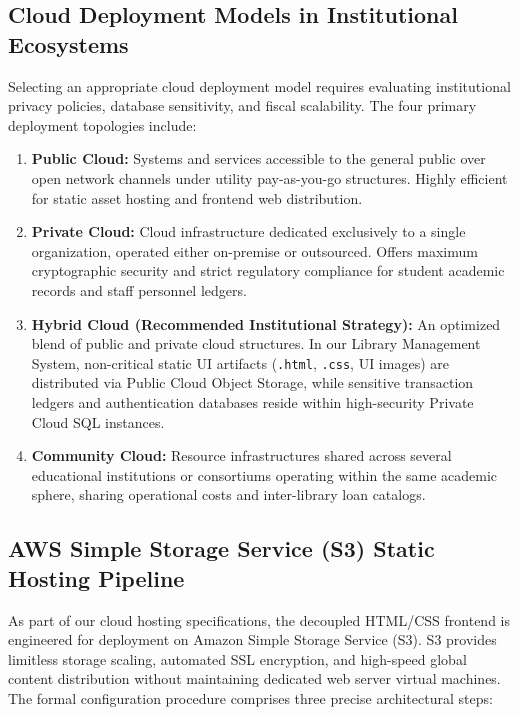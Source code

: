 \documentclass[10pt,journal,compsoc]{IEEEtran}
\begin{document}
\subsection{Cloud Deployment Models in Institutional Ecosystems}
Selecting an appropriate cloud deployment model requires evaluating institutional privacy policies, database sensitivity, and fiscal scalability. The four primary deployment topologies include:
\begin{enumerate}[leftmargin=1.5em]
    \item \textbf{Public Cloud:} Systems and services accessible to the general public over open network channels under utility pay-as-you-go structures. Highly efficient for static asset hosting and frontend web distribution.
    \item \textbf{Private Cloud:} Cloud infrastructure dedicated exclusively to a single organization, operated either on-premise or outsourced. Offers maximum cryptographic security and strict regulatory compliance for student academic records and staff personnel ledgers.
    \item \textbf{Hybrid Cloud (Recommended Institutional Strategy):} An optimized blend of public and private cloud structures. In our Library Management System, non-critical static UI artifacts (\texttt{.html}, \texttt{.css}, UI images) are distributed via Public Cloud Object Storage, while sensitive transaction ledgers and authentication databases reside within high-security Private Cloud SQL instances.
    \item \textbf{Community Cloud:} Resource infrastructures shared across several educational institutions or consortiums operating within the same academic sphere, sharing operational costs and inter-library loan catalogs.
\end{enumerate}

\subsection{AWS Simple Storage Service (S3) Static Hosting Pipeline}
As part of our cloud hosting specifications, the decoupled HTML/CSS frontend is engineered for deployment on Amazon Simple Storage Service (S3). S3 provides limitless storage scaling, automated SSL encryption, and high-speed global content distribution without maintaining dedicated web server virtual machines. The formal configuration procedure comprises three precise architectural steps:
\end{document}
